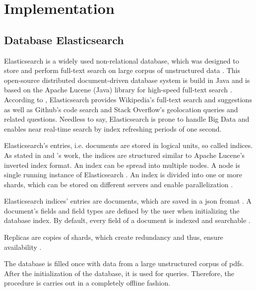 \newcommand{\databaseName}{Elasticsearch}
\chapter{Implementation}\label{ch:implementation}

\section{Database Elasticsearch}\label{subsec:db}
\databaseName{} is a widely used non-relational database, which was designed to store and perform full-text search on large corpus of unstructured data \cite{Elasticsearch2017}.
This open-source distributed document-driven database system is build in Java and is based on the Apache Lucene (Java) library for high-speed full-text search \cite{Elasticsearch2017,Elasticsearch2019}.
According to \cite{Elasticsearch2019}, \databaseName{} provides Wikipedia's full-text search and suggestions as well as Github's code search and Stack Overflow's geolocation queries and related questions.
Needless to say, \databaseName{} is prone to handle Big Data and enables near real-time search by index refreshing periods of one second.

\databaseName{}'s entries, i.e. documents are stored in logical units, so called indices.
As stated in \citeauthor{Elasticsearch2019} and \citeauthor{Elasticsearch2017}'s work, the indices are structured similar to Apache Lucene's inverted index format.
An index can be spread into multiple nodes.
A node is single running instance of \databaseName{} \cite{Elasticsearch2019}.
An index is divided into one or more shards, which can be stored on different servers and enable parallelization \cite{Elasticsearch2019}.

\databaseName{} indices' entries are documents, which are saved in a \ac{json} fromat \cite{Elasticsearch2017}.
A document's fields and field types are defined by the user when initializing the database index.
By default, every field of a document is indexed and searchable \cite{Elasticsearch2019}.

Replicas are copies of shards, which create redundancy and thus, ensure availability \cite{Elasticsearch2019}.

The database is filled once with data from a large unstructured corpus of \acp{pdf}.
After the initialization of the database, it is used for queries. 
Therefore, the procedure is carries out in a completely offline fashion.

